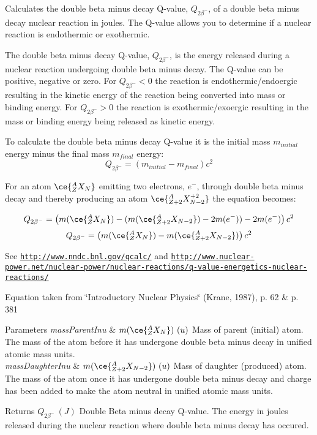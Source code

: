 Calculates the double beta minus decay Q-\/value, $Q_{2\beta^-}$, of a double beta minus decay nuclear reaction in joules. The Q-\/value allows you to determine if a nuclear reaction is endothermic or exothermic. 

The double beta minus decay Q-\/value, $Q_{2\beta^-}$, is the energy released during a nuclear reaction undergoing double beta minus decay. The Q-\/value can be positive, negative or zero. For $Q_{2\beta^-} < 0$ the reaction is endothermic/endoergic resulting in the kinetic energy of the reaction being converted into mass or binding energy. For $Q_{2\beta^-} > 0$ the reaction is exothermic/exoergic resulting in the mass or binding energy being released as kinetic energy.

To calculate the double beta minus decay Q-\/value it is the initial mass $m_{initial}$ energy minus the final mass $m_{final}$ energy\+: \[Q_{2\beta^-} = \left ( m_{initial}-m_{final}\right ) c^2\]

For an atom $\ce{ ^{A}_{Z}X_{N} }$ emitting two electrons, $e^-$, through double beta minus decay and thereby producing an atom $\ce{ ^{A}_{Z{+2}}X^{+2}_{N-2} }$ the equation becomes\+:

\[Q_{2\beta^-} = \left ( m(\ce{ ^{A}_{Z}X_{N} }) - (m(\ce{ ^{A}_{Z{+2}}X_{N-2} }) - 2m(e^-)) - 2m(e^-)\right ) c^2\] \[Q_{2\beta^-} = \left ( m(\ce{ ^{A}_{Z}X_{N} }) - m(\ce{ ^{A}_{Z{+2}}X_{N-2} })\right ) c^2\]

See \href{http://www.nndc.bnl.gov/qcalc/}{\tt http\+://www.\+nndc.\+bnl.\+gov/qcalc/} and \href{http://www.nuclear-power.net/nuclear-power/nuclear-reactions/q-value-energetics-nuclear-reactions/}{\tt http\+://www.\+nuclear-\/power.\+net/nuclear-\/power/nuclear-\/reactions/q-\/value-\/energetics-\/nuclear-\/reactions/}

Equation taken from \char`\"{}\+Introductory Nuclear Physics\char`\"{} (Krane, 1987), p. 62 \& p. 381


\begin{DoxyParams}{Parameters}
{\em mass\+Parent\+Inu} & $m(\ce{ ^{A}_{Z}X_{N} })\ (u)$ Mass of parent (initial) atom. The mass of the atom before it has undergone double beta minus decay in unified atomic mass units. \\
\hline
{\em mass\+Daughter\+Inu} & $m(\ce{ ^{A}_{Z{+2}}X_{N-2} })\ (u)$ Mass of daughter (produced) atom. The mass of the atom once it has undergone double beta minus decay and charge has been added to make the atom neutral in unified atomic mass units. \\
\hline
\end{DoxyParams}
\begin{DoxyReturn}{Returns}
$Q_{2\beta^-}\ (J)$ Double Beta minus decay Q-\/value. The energy in joules released during the nuclear reaction where double beta minus decay has occured. 
\end{DoxyReturn}
\mbox{\label{group___q_value_ga0eefdd84aa89d210e00dca043368dfeb}} 
